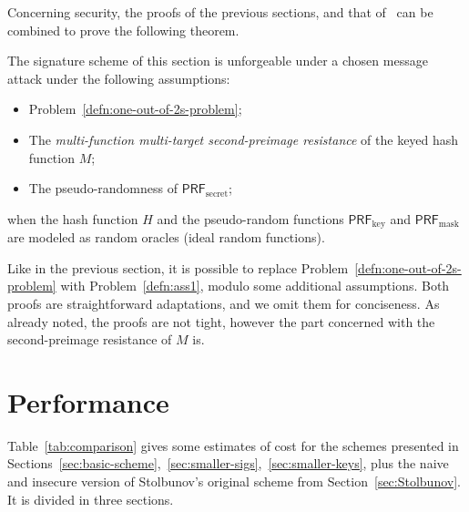 \documentclass{llncs}
\newcommand{\PRF}{\mathsf{PRF}}
\newcommand{\PRFk}{\PRF_{\mathrm{key}}}
\newcommand{\PRFm}{\PRF_{\mathrm{mask}}}
\newcommand{\PRFs}{\PRF_{\mathrm{secret}}}
\begin{document}
Concerning security, the proofs of the previous sections, and that of~\cite[Appendix~B]{10.1007/978-3-662-49384-7_15} can be combined to prove the following theorem.

\begin{theorem}
  The signature scheme of this section is unforgeable under a chosen
  message attack under the following assumptions:
  \begin{itemize}
  \item Problem~\ref{defn:one-out-of-2s-problem};
  \item The \emph{multi-function multi-target second-preimage resistance} of
    the keyed hash function $M$;
  \item The pseudo-randomness of $\PRFs$;
  \end{itemize}
  when the hash function $H$ and the pseudo-random functions $\PRFk$
  and $\PRFm$ are modeled as random oracles (ideal random functions).
\end{theorem}

Like in the previous section, it is possible to replace Problem~\ref{defn:one-out-of-2s-problem} with Problem~\ref{defn:ass1}, modulo some additional assumptions.
Both proofs are straightforward adaptations, and we omit them for conciseness.
As already noted, the proofs are not tight, however the part concerned with the second-preimage resistance of $M$ is.


\section{Performance}


Table~\ref{tab:comparison} gives some estimates of cost for the schemes presented in Sections~\ref{sec:basic-scheme},~\ref{sec:smaller-sigs},~\ref{sec:smaller-keys}, plus the naive and insecure version of Stolbunov's original scheme from Section~\ref{sec:Stolbunov}.
It is divided in three sections.
\end{document}
